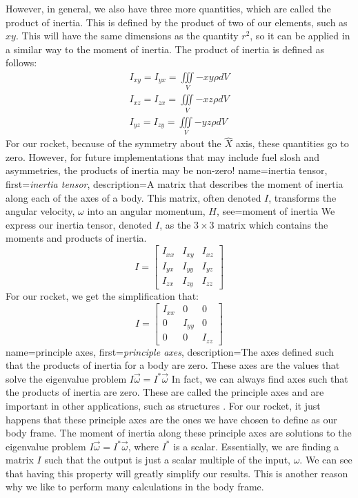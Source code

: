 \documentclass[12pt]{report}
\begin{document}
However, in general, we also have three more quantities, which are called the product of inertia. This is defined by the product of two of our elements, such as $xy$. This will have the same dimensions as the quantity $r^2$, so it can be applied in a similar way to the \gls{moment of inertia}. The product of inertia is defined as follows:
\begin{gather}
    I_{xy}=I_{yx}=\iiint\limits_V{-xy\rho}{dV}\\
    I_{xz}=I_{zx}=\iiint\limits_V{-xz\rho}{dV}\\
    I_{yz}=I_{zy}=\iiint\limits_V{-yz\rho}{dV}
\end{gather}
For our rocket, because of the symmetry about the $\hat{X}$ axis, these quantities go to zero. However, for future implementations that may include fuel slosh and asymmetries, the products of inertia may be non-zero!
{
    name={inertia tensor},
    first=\textit{inertia tensor},
    description={A matrix that describes the moment of inertia along each of the axes of a body. This matrix, often denoted $I$, transforms the angular velocity, $\omega$ into an angular momentum, $H$},
    see={moment of inertia}
}
We express our \gls{inertia tensor}, denoted $I$, as the $3\times3$ matrix which contains the moments and products of inertia.
$$I=\begin{bmatrix}
    I_{xx}&I_{xy}&I_{xz}\\
    I_{yx}&I_{yy}&I_{yz}\\
    I_{zx}&I_{zy}&I_{zz}
\end{bmatrix}$$
For our rocket, we get the simplification that:
$$I=\begin{bmatrix}
    I_{xx}&0&0\\
    0&I_{yy}&0\\
    0&0&I_{zz}
\end{bmatrix}$$
{
    name={principle axes},
    first=\textit{principle axes},
    description={The axes defined such that the products of inertia for a body are zero. These axes are the values that solve the eigenvalue problem $I\vec{\omega}=I^*\vec{\omega}$}
}
In fact, we can always find axes such that the products of inertia are zero. These are called the \gls{principle axes} and are important in other applications, such as structures \cite{baker_statics_2020}. For our rocket, it just happens that these \gls{principle axes} are the ones we have chosen to define as our \gls{body frame}. The \gls{moment of inertia} along these \gls{principle axes} are solutions to the eigenvalue problem $I\vec{\omega}=I^*\vec{\omega}$, where $I^*$ is a scalar. Essentially, we are finding a matrix $I$ such that the output is just a scalar multiple of the input, $\omega$. We can see that having this property will greatly simplify our results. This is another reason why we like to perform many calculations in the \gls{body frame}.
\end{document}
